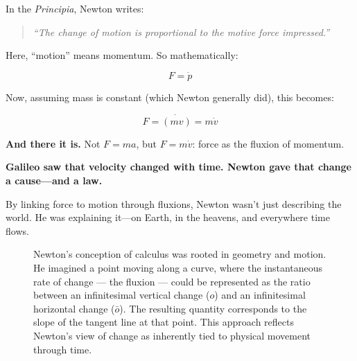   In the \textit{Principia}, Newton writes:

  \begin{quote}
  \textit{“The change of motion is proportional to the motive force impressed.”}
  \end{quote}

  Here, “motion” means momentum. So mathematically:

  \[
  F = \dot{p}
  \]
  
  Now, assuming mass is constant (which Newton generally did), this becomes:

  \[
  F = \dot{(mv)} = m\dot{v}
  \]
  
  \textbf{And there it is.} Not \( F = ma \), but \( F = m\dot{v} \): force as the fluxion of momentum.
  
  \textbf{Galileo saw that velocity changed with time. Newton gave that change a cause—and a law.}
  
  By linking force to motion through fluxions, Newton wasn’t just describing the world. He was explaining it—on Earth, in the heavens, and everywhere time flows.


\begin{figure}[H]
\centering
{}

\vspace{0.5em}
\caption{\small Newton's conception of calculus was rooted in geometry and motion. He imagined a point moving along a curve, where the instantaneous rate of change — the fluxion — could be represented as the ratio between an infinitesimal vertical change ($o$) and an infinitesimal horizontal change ($\bar{o}$). The resulting quantity corresponds to the slope of the tangent line at that point. This approach reflects Newton’s view of change as inherently tied to physical movement through time.}
\end{figure}




